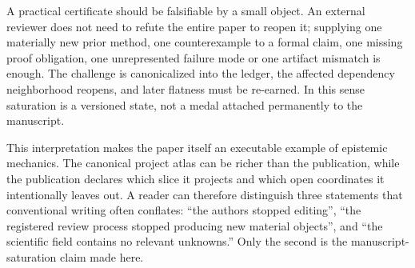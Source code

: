 A practical certificate should be falsifiable by a small object. An external reviewer does not need to refute the entire paper to reopen it; supplying one materially new prior method, one counterexample to a formal claim, one missing proof obligation, one unrepresented failure mode or one artifact mismatch is enough. The challenge is canonicalized into the ledger, the affected dependency neighborhood reopens, and later flatness must be re-earned. In this sense saturation is a versioned state, not a medal attached permanently to the manuscript.

This interpretation makes the paper itself an executable example of epistemic mechanics. The canonical project atlas can be richer than the publication, while the publication declares which slice it projects and which open coordinates it intentionally leaves out. A reader can therefore distinguish three statements that conventional writing often conflates: ``the authors stopped editing'', ``the registered review process stopped producing new material objects'', and ``the scientific field contains no relevant unknowns.'' Only the second is the manuscript-saturation claim made here.
